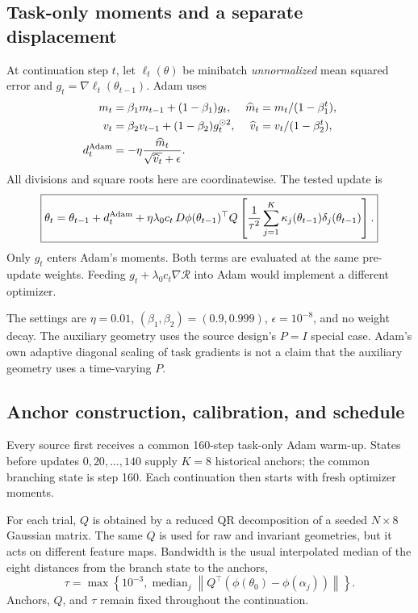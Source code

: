 \documentclass[11pt,letterpaper]{article}
\theoremstyle{remark}\newtheorem{remark}{Remark}
\newcommand{\norm}[1]{\left\lVert#1\right\rVert}
\begin{document}
\subsection{Task-only moments and a separate displacement}
At continuation step $t$, let $\ell_t(\theta)$ be minibatch \emph{unnormalized} mean squared error and $g_t=\nabla\ell_t(\theta_{t-1})$. Adam uses
\begin{align}
m_t&=\beta_1m_{t-1}+(1-\beta_1)g_t,&
\widehat m_t&=m_t/(1-\beta_1^t),\\
v_t&=\beta_2v_{t-1}+(1-\beta_2)g_t^{\odot2},&
\widehat v_t&=v_t/(1-\beta_2^t),\\
d_t^{\rm Adam}&=-\eta\frac{\widehat m_t}{\sqrt{\widehat v_t}+\epsilon}.&&
\end{align}
All divisions and square roots here are coordinatewise. The tested update is
\begin{equation}\label{eq:mainupdate}
\boxed{\theta_t=\theta_{t-1}+d_t^{\rm Adam}
+\eta\lambda_0 c_t\,D\phi(\theta_{t-1})^\top Q
\left[\frac{1}{\tau^2}\sum_{j=1}^{K}\kappa_j(\theta_{t-1})\delta_j(\theta_{t-1})\right].}
\end{equation}
Only $g_t$ enters Adam's moments. Both terms are evaluated at the same pre-update weights. Feeding $g_t+\lambda_0c_t\nabla\mathcal R$ into Adam would implement a different optimizer.

The settings are $\eta=0.01$, $(\beta_1,\beta_2)=(0.9,0.999)$, $\epsilon=10^{-8}$, and no weight decay. The auxiliary geometry uses the source design's $P=I$ special case. Adam's own adaptive diagonal scaling of task gradients is not a claim that the auxiliary geometry uses a time-varying $P$.

\subsection{Anchor construction, calibration, and schedule}
Every source first receives a common 160-step task-only Adam warm-up. States before updates $0,20,\ldots,140$ supply $K=8$ historical anchors; the common branching state is step 160. Each continuation then starts with fresh optimizer moments.

For each trial, $Q$ is obtained by a reduced QR decomposition of a seeded $N\times8$ Gaussian matrix. The same $Q$ is used for raw and invariant geometries, but it acts on different feature maps. Bandwidth is the usual interpolated median of the eight distances from the branch state to the anchors,
\begin{equation}
\tau=\max\left\{10^{-3},\operatorname{median}_j\norm{Q^\top(\phi(\theta_0)-\phi(\alpha_j))}\right\}.
\end{equation}
Anchors, $Q$, and $\tau$ remain fixed throughout the continuation.
\end{document}
